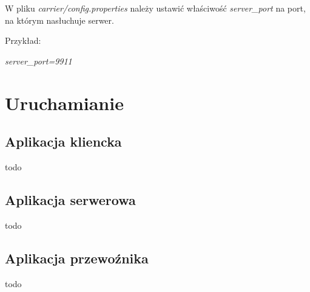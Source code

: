 \documentclass[pdftex,13pt,a4paper]{article}
\begin{document}
	W pliku \emph{carrier/config.properties} należy ustawić właściwość \emph{server\_port} na port, na którym nasłuchuje serwer. 
  
  Przykład: 
  
  \emph{server\_port=9911}

\section{Uruchamianie}

\subsection{Aplikacja kliencka}
todo

\subsection{Aplikacja serwerowa}
todo

\subsection{Aplikacja przewoźnika}
todo
\end{document}
